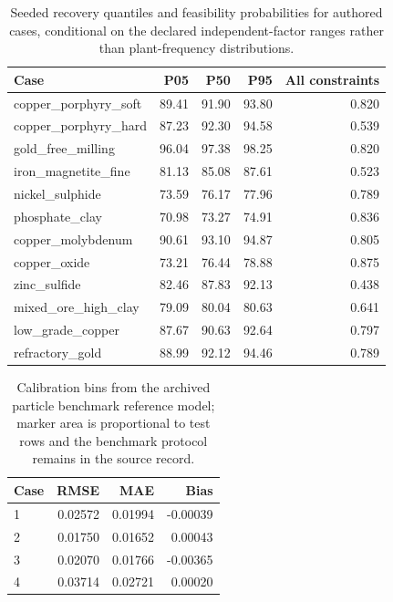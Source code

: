 \begin{table}[htbp]
\centering
\small
\caption{Seeded recovery quantiles and feasibility probabilities for authored cases, conditional on the declared independent-factor ranges rather than plant-frequency distributions.}
\label{tab:uncertainty}
\begin{tabular}{lrrrr}
\toprule
Case & P05 & P50 & P95 & All constraints \\
\midrule
copper\_porphyry\_soft & 89.41 & 91.90 & 93.80 & 0.820 \\
copper\_porphyry\_hard & 87.23 & 92.30 & 94.58 & 0.539 \\
gold\_free\_milling & 96.04 & 97.38 & 98.25 & 0.820 \\
iron\_magnetite\_fine & 81.13 & 85.08 & 87.61 & 0.523 \\
nickel\_sulphide & 73.59 & 76.17 & 77.96 & 0.789 \\
phosphate\_clay & 70.98 & 73.27 & 74.91 & 0.836 \\
copper\_molybdenum & 90.61 & 93.10 & 94.87 & 0.805 \\
copper\_oxide & 73.21 & 76.44 & 78.88 & 0.875 \\
zinc\_sulfide & 82.46 & 87.83 & 92.13 & 0.438 \\
mixed\_ore\_high\_clay & 79.09 & 80.04 & 80.63 & 0.641 \\
low\_grade\_copper & 87.67 & 90.63 & 92.64 & 0.797 \\
refractory\_gold & 88.99 & 92.12 & 94.46 & 0.789 \\
\bottomrule
\end{tabular}
\end{table}
\begin{table}[htbp]
\centering
\small
\caption{Calibration bins from the archived particle benchmark reference model; marker area is proportional to test rows and the benchmark protocol remains in the source record.}
\label{tab:particle-reference}
\begin{tabular}{lrrr}
\toprule
Case & RMSE & MAE & Bias \\
\midrule
1 & 0.02572 & 0.01994 & -0.00039 \\
2 & 0.01750 & 0.01652 & 0.00043 \\
3 & 0.02070 & 0.01766 & -0.00365 \\
4 & 0.03714 & 0.02721 & 0.00020 \\
\bottomrule
\end{tabular}
\end{table}
